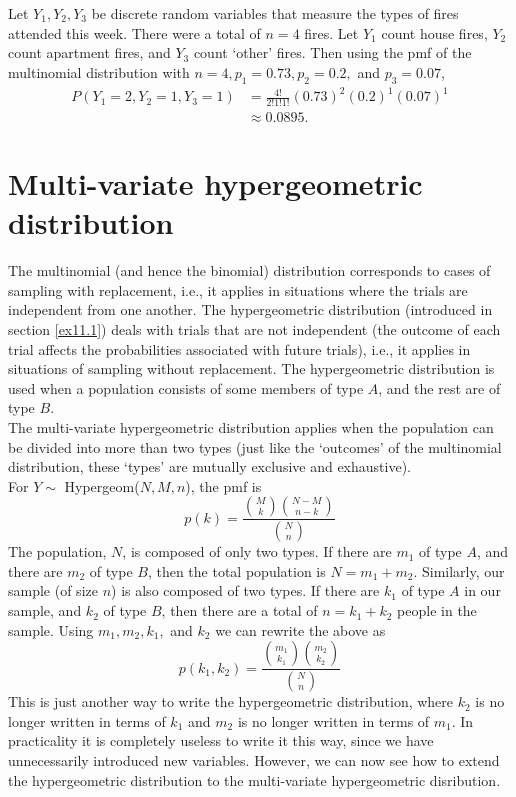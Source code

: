 \solution
Let $Y_1,Y_2,Y_3$ be discrete random variables that measure the types of fires attended this week. There were a total of $n = 4$ fires. Let $Y_1$ count house fires, $Y_2$ count apartment fires, and $Y_3$ count `other' fires. Then using the pmf of the multinomial distribution with $n = 4, p_1 = 0.73, p_2 = 0.2,$ and $p_3 = 0.07$,
\begin{align*}
P(Y_1 = 2,Y_2 = 1,Y_3 = 1) & = \frac{4!}{2!1!1!}(0.73)^2(0.2)^1(0.07)^1 \\
	& \approx 0.0895.
\end{align*}

\section{Multi-variate hypergeometric distribution} \label{Multi-variate hypergeometric distribution}
The multinomial (and hence the binomial) distribution corresponds to cases of sampling with replacement, i.e., it applies in situations where the trials are independent from one another. The hypergeometric distribution (introduced in section \ref{ex11.1}) deals with trials that are not independent (the outcome of each trial affects the probabilities associated with future trials), i.e., it applies in situations of sampling without replacement. The hypergeometric distribution is used when a population consists of some members of type $A$, and the rest are of type $B$. \\

\noindent The multi-variate hypergeometric distribution applies when the population can be divided into more than two types (just like the `outcomes' of the multinomial distribution, these `types' are mutually exclusive and exhaustive). \\

\noindent For $Y \sim$ Hypergeom($N,M,n$), the pmf is
\[
p(k) = \frac{\binom{M}{k}\binom{N-M}{n-k}}{\binom{N}{n}}
\]
The population, $N$, is composed of only two types. If there are $m_1$ of type $A$, and there are $m_2$ of type $B$, then the total population is $N = m_1 + m_2$. Similarly, our sample (of size $n$) is also composed of two types. If there are $k_1$ of type $A$ in our sample, and $k_2$ of type $B$, then there are a total of $n = k_1 + k_2$ people in the sample. Using $m_1, m_2, k_1,$ and $k_2$ we can rewrite the above as
\[
p(k_1,k_2) = \frac{\binom{m_1}{k_1}\binom{m_2}{k_2}}{\binom{N}{n}}
\]
This is just another way to write the hypergeometric distribution, where $k_2$ is no longer written in terms of $k_1$ and $m_2$ is no longer written in terms of $m_1$. In practicality it is completely useless to write it this way, since we have unnecessarily introduced new variables. However, we can now see how to extend the hypergeometric distribution to the multi-variate hypergeometric disribution. \\

